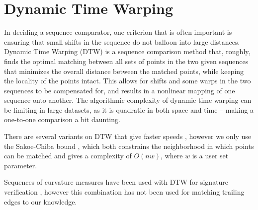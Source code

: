 \section{Dynamic Time Warping}

In deciding a sequence comparator, one criterion that is often important is ensuring that small shifts in the sequence do not balloon into large distances.
Dynamic Time Warping (DTW) is a sequence comparison method that, roughly, finds the optimal matching between all sets of points in the two given sequences that minimizes the overall distance between the matched points, while keeping the locality of the points intact.
This allows for shifts and some warps in the two sequences to be compensated for, and results in a nonlinear mapping of one sequence onto another.
The algorithmic complexity of dynamic time warping can be limiting in large datasets, as it is quadratic in both space and time -- making a one-to-one comparison a bit daunting.

There are several variants on DTW that give faster speeds \cite{salvador2007fastdtw} \cite{lemire2009faster}, however we only use the Sakoe-Chiba bound \cite{sakoe1978dynamic}, which both constrains the neighborhood in which points can be matched and gives a complexity of $O(nw)$, where $w$ is a user set parameter.

Sequences of curvature measures have been used with DTW for signature verification \cite{munich1999continuous}, however this combination has not been used for matching trailing edges to our knowledge.

